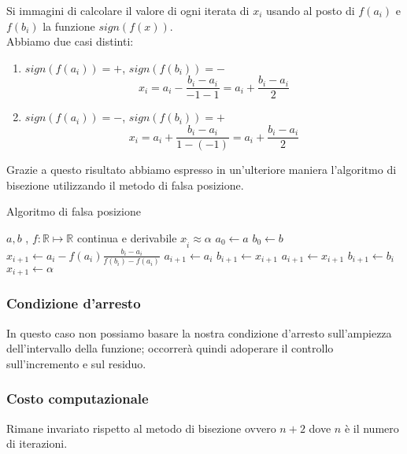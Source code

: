 \documentclass[12pt, a4paper]{book}
\theoremstyle{definition}
\begin{document}
\begin{flushleft}
Si immagini di calcolare il valore di ogni iterata di $x_{i}$ usando al posto di $f(a_{i})$ e $f(b_{i})$ la funzione $sign(f(x))$.\\
Abbiamo due casi distinti:
\begin{enumerate}
	\item $sign(f(a_{i})) = +$, $sign(f(b_{i})) = -$ 
		\[
		 	x_{i} = a_{i} -  \frac{b_{i} - a_{i}}{-1 - 1} =  a_{i} +  \frac{b_{i} - a_{i}}{2} 
		\]
	\item $sign(f(a_{i})) = -$, $sign(f(b_{i})) = +$ 
		\[
		 	x_{i} = a_{i} +  \frac{b_{i} - a_{i}}{1 - (-1)} =  a_{i} +  \frac{b_{i} - a_{i}}{2} 
		\]
\end{enumerate}
Grazie a questo risultato abbiamo espresso in un'ulteriore maniera l'algoritmo di bisezione utilizzando il metodo di falsa posizione.
\begin{algorithm}
\caption{Algoritmo di falsa posizione}
	\begin{algorithmic} 
		\REQUIRE $a, b$ , $f: \mathbb{R} \mapsto \mathbb{R}$ continua e derivabile
		\ENSURE $x_{\hat{i}} \approx \alpha$
		\STATE $ a_{0} \leftarrow  a$
		\STATE $ b_{0} \leftarrow  b$
			\STATE $ x_{i+1} \leftarrow  a_{i} - f(a_{i})  \frac{b_{i} - a_{i}}{f(b_{i}) - f(a_{i})}$
				\STATE $ a_{i+1} \leftarrow  a_{i}$
				\STATE $ b_{i+1} \leftarrow  x_{i+1}$
			\ENDIF
				\STATE $ a_{i+1} \leftarrow  x_{i+1}$
				\STATE $ b_{i+1} \leftarrow  b_{i}$
			\ENDIF
				\STATE $ x_{i+1} \leftarrow  \alpha$
			\ENDIF
		\ENDWHILE
	\end{algorithmic}
\end{algorithm}

\subsubsection{Condizione d'arresto}
In questo caso non possiamo basare la nostra condizione d'arresto sull'ampiezza dell'intervallo della funzione; occorrerà quindi adoperare il controllo sull'incremento e sul residuo. 

\subsubsection{Costo computazionale}
Rimane invariato rispetto al metodo di bisezione ovvero $n + 2$ dove $n$ è il numero di iterazioni.
\end{flushleft}
\end{document}
